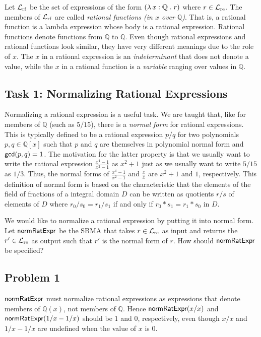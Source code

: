 \documentclass[fleqn]{llncs}
\newcommand{\QQ}{\ensuremath{\mathbb{Q}}}
\newcommand{\NRE}{\ensuremath{\mname{normRatExpr}}}
\newcommand{\funQ}[1]{\ensuremath{\LambdaApp x : \QQ \mdot #1}}
\newcommand{\Langre}{\ensuremath{\mathcal{L}}_{\rm re}}
\newcommand{\Langrf}{\ensuremath{\mathcal{L}}_{\rm rf}}
\begin{document}
Let $\Langrf$ be the set of expressions of the form $(\funQ{r})$ where
$r \in \Langre$.  The members of $\Langrf$ are called \emph{rational
  functions (in $x$ over $\QQ$)}.  That is, a rational function is a
lambda expression whose body is a rational expression.  Rational
functions denote functions from $\QQ$ to $\QQ$.  Even though rational
expressions and rational functions look similar, they have very
different meanings due to the role of $x$.  The $x$ in a rational
expression is an \emph{indeterminant} that does not denote a value,
while the $x$ in a rational function is a \emph{variable} ranging over
values in $\QQ$.

\subsection{Task 1: Normalizing Rational Expressions}

Normalizing a rational expression is a useful task.  We are taught
that, like for members of $\QQ$ (such as $5/15$), there is a
\emph{normal form} for rational expressions. This is typically defined
to be a rational expression $p/q$ for two polynomials $p,q \in \QQ[x]$
such that $p$ and $q$ are themselves in polynomial normal form and
$\mbox{\sf gcd}(p,q) = 1$.  The motivation for the latter property is
that we usually want to write the rational expression
$\frac{x^4-1}{x^2-1}$ as $x^2 + 1$ just as we usually want to write
$5/15$ as $1/3$.  Thus, the normal forms of $\frac{x^4-1}{x^2-1}$ and
$\frac{x}{x}$ are $x^2 + 1$ and $1$, respectively.  This definition of
normal form is based on the characteristic that the elements of the
field of fractions of a integral domain $D$ can be written as
quotients $r/s$ of elements of $D$ where $r_0/s_0 = r_1/s_1$ if and
only if $r_0 * s_1 = r_1 * s_0$ in $D$.

We would like to normalize a rational expression by putting it into
normal form.  Let $\NRE$ be the SBMA that takes $r \in \Langre$ as
input and returns the $r' \in \Langre$ as output such that $r'$ is the
normal form of $r$.  How should $\NRE$ be specified?

\subsection{Problem 1}

\bsp $\NRE$ must normalize rational expressions as expressions that
denote members of $\QQ(x)$, not members of $\QQ$.  Hence $\NRE(x/x)$
and $\NRE(1/x - 1/x)$ should be $1$ and $0$, respectively, even though
$x/x$ and $1/x - 1/x$ are undefined when the value of $x$ is 0.  \esp
\end{document}
